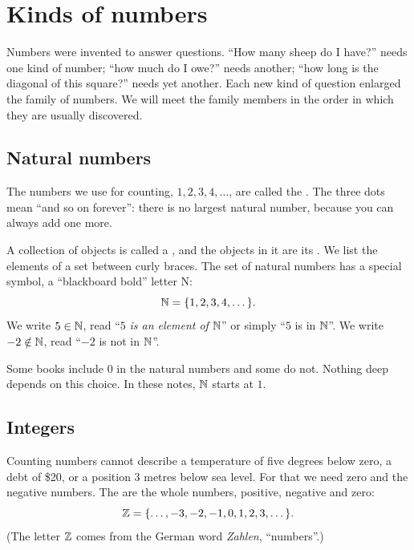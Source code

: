 \section{Kinds of numbers}\label{sec:kinds-of-numbers}

Numbers were invented to answer questions. ``How many sheep do I have?'' needs
one kind of number; ``how much do I owe?'' needs another; ``how long is the
diagonal of this square?'' needs yet another. Each new kind of question
enlarged the family of numbers. We will meet the family members in the order
in which they are usually discovered.

\subsection{Natural numbers}

The numbers we use for counting, $1, 2, 3, 4, \dots$, are called the
. The three dots mean ``and so on
forever'': there is no largest natural number, because you can always add
one more.

\begin{notation}
A collection of objects is called a , and the objects in it are its
. We list the elements of a set between curly
braces. The set of natural numbers has a special symbol, a ``blackboard
bold'' letter N:
\[
  \mathbb{N} = \{1, 2, 3, 4, \dots\}.
\]
We write $5 \in \mathbb{N}$, read ``$5$ \emph{is an element of} $\mathbb{N}$'' or simply ``$5$
is in $\mathbb{N}$''. We write $-2 \notin \mathbb{N}$, read ``$-2$ is not in $\mathbb{N}$''.
\end{notation}

\begin{remark}
Some books include $0$ in the natural numbers and some do not. Nothing deep
depends on this choice. In these notes, $\mathbb{N}$ starts at $1$.
\end{remark}

\subsection{Integers}

Counting numbers cannot describe a temperature of five degrees below zero, a
debt of \$20, or a position $3$ metres below sea level. For that we need zero
and the negative numbers. The  are the whole numbers,
positive, negative and zero:
\[
  \mathbb{Z} = \{\dots, -3, -2, -1, 0, 1, 2, 3, \dots\}.
\]
(The letter $\mathbb{Z}$ comes from the German word \emph{Zahlen}, ``numbers''.)

